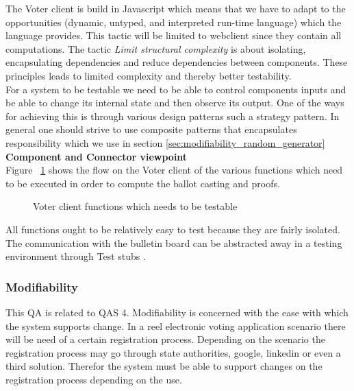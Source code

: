 \noindent
The Voter client is build in Javascript which means that we have to adapt to the opportunities (dynamic, untyped, and interpreted run-time language) which the language provides. This tactic will be limited to webclient since they contain all computations. The tactic \textit{Limit structural complexity} is about isolating, encapsulating dependencies and reduce dependencies between components. These principles leads to limited complexity and thereby better testability.   \\

\noindent
 For a system to be testable we need to be able to control components inputs and be able to change its internal state and then observe its output. One of the ways for achieving this is through various design patterns such a strategy pattern. In general one should strive to use composite patterns that encapsulates responsibility which we use in section \ref{sec:modifiability_random_generator}  \\


\noindent
\textbf{Component and Connector viewpoint}\\
Figure ~\ref{fig:voterclient_functions_which_needs_to_be_testable}  shows the flow on the Voter client of the various functions which need to be executed in order to compute the ballot casting and proofs.

\begin{figure}[H]
\centering
  \caption{Voter client functions which needs to be testable}  
   \label{fig:voterclient_functions_which_needs_to_be_testable}
\end{figure}


\noindent
All functions ought to be relatively easy to test because they are fairly isolated. The communication with the bulletin board can be abstracted away in a testing environment through Test stubs \cite{Baerbak10}. 


\subsubsection{Modifiability} \label{sec:modifiability_registations_process}
This QA is related to QAS 4. Modifiability is concerned with the ease with which the system supports change. In a reel electronic voting application scenario there will be need of a certain registration process. Depending on the scenario the registration process may go through state authorities, google, linkedin or even a third solution. Therefor the system must be able to support changes on the registration process depending on the use. 

